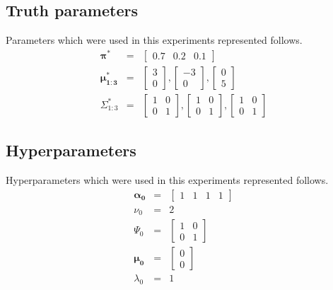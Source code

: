 \documentclass[a4paper]{article}
\begin{document}
\subsection{Truth parameters}
Parameters which were used in this experiments represented follows.
\begin{eqnarray}
	\boldsymbol{\pi^*} &=& \left[ \begin{array}{ccc}
		0.7 & 0.2 & 0.1
	\end{array}
	\right]\\
	\boldsymbol{\mu^*_{1:3}} &=& 
	\left[\begin{array}{c}
		3\\
		0
	\end{array}\right]
	, 
	\left[\begin{array}{c}
		-3\\
		0
	\end{array}\right]
	, 
	\left[\begin{array}{c}
		0\\
		5
	\end{array}\right]\\
	\Sigma^*_{1:3} &=& 
	\left[\begin{array}{cc}
		1 & 0\\
		0 & 1
	\end{array}\right]
	, 
	\left[\begin{array}{cc}
		1 & 0\\
		0 & 1
	\end{array}\right]
	, \left[\begin{array}{cc}
		1 & 0\\
		0 & 1
	\end{array}\right]
\end{eqnarray}

\subsection{Hyperparameters}
Hyperparameters which were used in this experiments represented follows.
\begin{eqnarray}
	\boldsymbol{\alpha_0} &=& \left[\begin{array}{cccc} 1 & 1 & 1 & 1\end{array}\right]\\
	\nu_0 &=& 2\\
	\Psi_0 &=& \left[\begin{array}{cc}
		1 & 0\\
		0 & 1
	\end{array}\right]\\
	\boldsymbol{\mu_0} &=& \left[\begin{array}{c}
		0\\
		0
	\end{array}\right]\\
	\lambda_0 &=& 1
\end{eqnarray}
\end{document}
